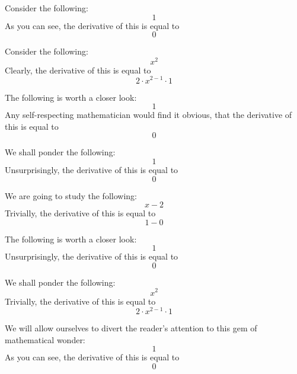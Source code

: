 \documentclass{article}
\begin{document}
Consider the following:
\begin{equation}
1 
\end{equation}
As you can see, the derivative of this is equal to
\begin{equation}
0 
\end{equation}

Consider the following:
\begin{equation}
x ^{2 } 
\end{equation}
Clearly, the derivative of this is equal to
\begin{equation}
2 \cdot x ^{2 - 1 } \cdot 1 
\end{equation}

The following is worth a closer look:
\begin{equation}
1 
\end{equation}
Any self-respecting mathematician would find it obvious, that the derivative of this is equal to
\begin{equation}
0 
\end{equation}

We shall ponder the following:
\begin{equation}
1 
\end{equation}
Unsurprisingly, the derivative of this is equal to
\begin{equation}
0 
\end{equation}

We are going to study the following:
\begin{equation}
x - 2 
\end{equation}
Trivially, the derivative of this is equal to
\begin{equation}
1 - 0 
\end{equation}

The following is worth a closer look:
\begin{equation}
1 
\end{equation}
Unsurprisingly, the derivative of this is equal to
\begin{equation}
0 
\end{equation}

We shall ponder the following:
\begin{equation}
x ^{2 } 
\end{equation}
Trivially, the derivative of this is equal to
\begin{equation}
2 \cdot x ^{2 - 1 } \cdot 1 
\end{equation}

We will allow ourselves to divert the reader's attention to this gem of mathematical wonder:
\begin{equation}
1 
\end{equation}
As you can see, the derivative of this is equal to
\begin{equation}
0 
\end{equation}
\end{document}
